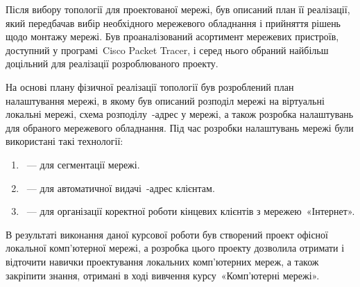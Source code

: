 \documentclass[
  ukrainian,
  simple,
  floatsection,
]{eskdnaukvd}
\begin{document}
    Після вибору топології для проектованої мережі, був описаний план її реалізації, який передбачав вибір необхідного мережевого обладнання і прийняття рішень щодо монтажу мережі. Був проаналізований асортимент мережевих пристроїв, доступний у програмі~\textenglish{Cisco Packet Tracer}, і серед нього обраний найбільш доцільний для реалізації розроблюваного проекту.

    На основі плану фізичної реалізації топології був розроблений план налаштування мережі, в якому був описаний розподіл мережі на віртуальні локальні мережі, схема розподілу~\textenglish{}-адрес у мережі, а також розробка налаштувань для обраного мережевого обладнання. Під час розробки налаштувань мережі були використані такі технології:
    \begin{enumerate}
      \item \textenglish{}~— для сегментації мережі.
      \item \textenglish{}~— для автоматичної видачі~\textenglish{}-адрес клієнтам.
      \item \textenglish{}~— для організації коректної роботи кінцевих клієнтів з мережею~«Інтернет».
    \end{enumerate}

    В результаті виконання даної курсової роботи був створений проект офісної локальної комп'ютерної мережі, а розробка цього проекту дозволила отримати і відточити навички проектування локальних комп'ютерних мереж, а також закріпити знання, отримані в ході вивчення курсу~«Комп'ютерні мережі».
\end{document}

